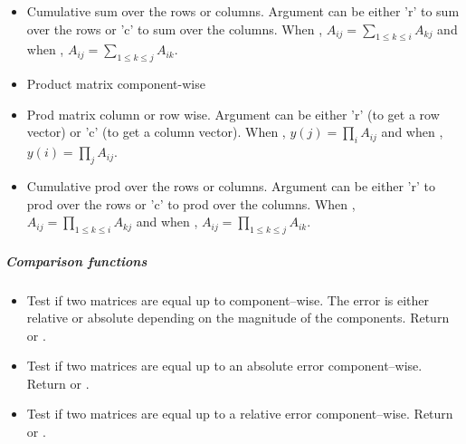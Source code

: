 \begin{itemize}
\item {} 
  \sshortdescribe Cumulative sum over the rows or columns. Argument 
  can be either 'r' to sum over the rows or 'c' to sum over the columns. When
  , $A_{ij} = \sum_{1 \le k \le i} A_{kj}$ and when , 
  $A_{ij} = \sum_{1 \le k \le j} A_{ik}$.

\item {}
  \sshortdescribe Product matrix component-wise

\item {}
  \sshortdescribe Prod matrix column or row wise. Argument  can be
  either 'r' (to get a row vector) or 'c' (to get a column vector). When
  , $y(j) = \prod_i A_{ij}$ and when , $y(i) = \prod_j
  A_{ij}$.

\item {} 
  \sshortdescribe Cumulative prod over the rows or columns. Argument 
  can be either 'r' to prod over the rows or 'c' to prod over the columns. When
  , $A_{ij} = \prod_{1 \le k \le i} A_{kj}$ and when , 
  $A_{ij} = \prod_{1 \le k \le j} A_{ik}$.
\end{itemize}

\subparagraph{Comparison functions}

\begin{itemize}
  \item {}
    \sshortdescribe Test if two matrices are equal up to  component--wise. The error  is either relative or absolute depending on the magnitude of the components. Return  or .
  \item {}
    \sshortdescribe Test if two matrices are equal up to an absolute error  component--wise. Return  or .
  \item {}
    \sshortdescribe Test if two matrices are equal up to a relative error  component--wise. Return  or .
\end{itemize}

